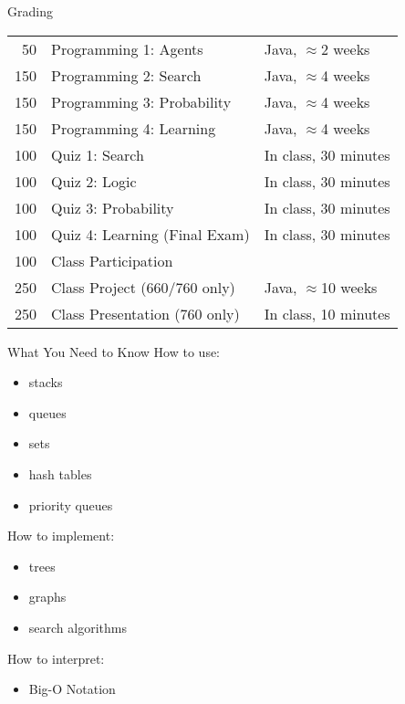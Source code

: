 \documentclass[14pt]{beamer}
\begin{document}
\begin{frame}{Grading}
\begin{tabular}{@{} r l l @{}}
\hline
 50 & Programming 1: Agents & Java, $\approx$2 weeks \\
150 & Programming 2: Search & Java, $\approx$4 weeks  \\
150 & Programming 3: Probability & Java, $\approx$4 weeks  \\
150 & Programming 4: Learning & Java, $\approx$4 weeks  \\
\hline
100 & Quiz 1: Search & In class, 30 minutes \\
100 & Quiz 2: Logic & In class, 30 minutes \\
100 & Quiz 3: Probability & In class, 30 minutes \\
100 & Quiz 4: Learning (Final Exam) & In class, 30 minutes \\
\hline
100 & Class Participation \\
\hline
250 & Class Project (\alert{660/760 only}) & Java, $\approx$10 weeks \\
250 & Class Presentation (\alert{760 only}) & In class, 10 minutes \\
\hline
\end{tabular}
\end{frame}


\begin{frame}{What You Need to Know}
How to use:
\begin{itemize}
\item stacks
\item queues
\item sets
\item hash tables
\item priority queues
\end{itemize}
How to implement:
\begin{itemize}
\item trees
\item graphs
\item search algorithms
\end{itemize}
How to interpret:
\begin{itemize}
\item Big-O Notation
\end{itemize}
\end{frame}


\begin{frame}{\ }
\end{frame}

\end{document}
